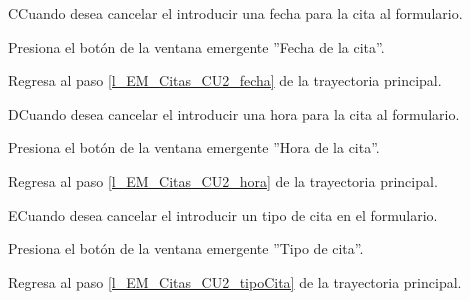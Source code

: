 \begin{UCtrayectoriaA}{C}{Cuando desea cancelar el introducir una fecha para la cita al formulario.}

	\UCpaso [\UCactor] Presiona el botón  de la ventana emergente ''Fecha de la cita''.

	\UCpaso Regresa al paso \ref{l_EM_Citas_CU2_fecha} de la trayectoria principal.
	
\end{UCtrayectoriaA}

\begin{UCtrayectoriaA}{D}{Cuando desea cancelar el introducir una hora para la cita al formulario.}

	\UCpaso [\UCactor] Presiona el botón  de la ventana emergente ''Hora de la cita''. 

	\UCpaso Regresa al paso \ref{l_EM_Citas_CU2_hora} de la trayectoria principal.
	
\end{UCtrayectoriaA}

\begin{UCtrayectoriaA}{E}{Cuando desea cancelar el introducir un tipo de cita en el formulario.}

	\UCpaso [\UCactor] Presiona el botón  de la ventana emergente ''Tipo de cita''. 

	\UCpaso Regresa al paso \ref{l_EM_Citas_CU2_tipoCita} de la trayectoria principal.
	
\end{UCtrayectoriaA}